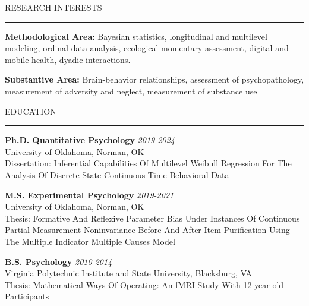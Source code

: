 \documentclass{resume} %
\renewenvironment{rSection}[1]{
	\sectionskip
	\textcolor{CarnegieMellonRed}{\MakeUppercase{#1}}
	\sectionlineskip
	\hrule
	\begin{list}{}{
			\setlength{\leftmargin}{1.5em}
		}
		\item[]
	}{
	\end{list}
}
\begin{document}
	\begin{rSection}{Research Interests}
		\textbf{Methodological Area:} Bayesian statistics, longitudinal and multilevel modeling, ordinal data analysis, ecological
		momentary assessment, digital and mobile health, dyadic interactions.
		
		\textbf{Substantive Area:} Brain-behavior relationships, assessment of psychopathology, measurement of adversity and neglect, measurement of substance use
	\end{rSection}
	
	
	\begin{rSection}{Education}
		{\bf Ph.D. Quantitative Psychology} \hfill {\em 2019-2024} 
		\\ University of Oklahoma, Norman, OK \hfill
		\\ Dissertation: Inferential Capabilities Of Multilevel Weibull Regression For The Analysis Of Discrete-State Continuous-Time Behavioral Data \hfill 
		
		{\bf M.S. Experimental Psychology} \hfill {\em 2019-2021} 
		\\ University of Oklahoma, Norman, OK \hfill
		\\ Thesis: Formative And Reflexive Parameter Bias Under Instances Of Continuous Partial Measurement Noninvariance Before And After Item Purification Using The Multiple Indicator Multiple Causes Model \hfill
		
		{\bf B.S. Psychology} \hfill {\em 2010-2014}
		\\ Virginia Polytechnic Institute and State University, Blacksburg, VA \hfill
		\\ Thesis: Mathematical Ways Of Operating: An fMRI Study With 12-year-old Participants \hfill
		
	\end{rSection}
	
	
	
\end{document}

